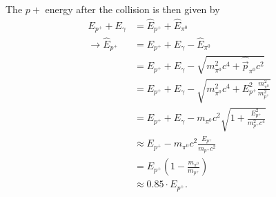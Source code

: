 \documentclass[10pt,a4paper]{book}
\theoremstyle{definition}
\begin{document}
\begin{enumerate}
    The $p+$ energy after the collision is then given by 
    \begin{align}
        E_{p^+}+E_\gamma&=\hat E_{p^+}+\hat E_{\pi^0}\\
        \rightarrow\hat E_{p^+}&=E_{p^+}+E_\gamma - \hat E_{\pi^0}\\
        &=E_{p^+}+E_\gamma - \sqrt{m_{\pi^0}^2c^4+\hat{\vec{p}}_{\pi^0}c^2}\\
        &=E_{p^+}+E_\gamma - \sqrt{m_{\pi^0}^2c^4+E_{p^+}^2\frac{m_{\pi^0}^2}{m_{p^+}^2}}\\
        &=E_{p^+}+E_\gamma - m_{\pi^0}c^2\sqrt{1+\frac{E_{p^+}^2}{m_{p^+}^2c^4}}\\
        &\approx E_{p^+} - m_{\pi^0}c^2\frac{E_{p^+}}{m_{p^+}c^2}\\
        &=E_{p^+}\left(1-\frac{m_{\pi^0}}{m_{p^+}}\right)\\
        &\approx0.85\cdot E_{p^+}.
    \end{align}
\end{enumerate}
\end{document}
